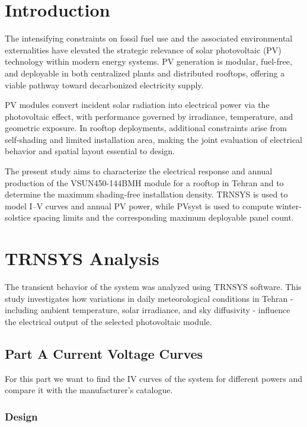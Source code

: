 \documentclass[11pt,a4paper]{article}
\begin{document}
\FloatBarrier
\section{Introduction}

The intensifying constraints on fossil fuel use and the associated environmental externalities have elevated the strategic relevance of solar photovoltaic (PV) technology within modern energy systems. PV generation is modular, fuel-free, and deployable in both centralized plants and distributed rooftops, offering a viable pathway toward decarbonized electricity supply.

PV modules convert incident solar radiation into electrical power via the photovoltaic effect, with performance governed by irradiance, temperature, and geometric exposure. In rooftop deployments, additional constraints arise from self-shading and limited installation area, making the joint evaluation of electrical behavior and spatial layout essential to design.

The present study aims to characterize the electrical response and annual production of the VSUN450-144BMH module for a rooftop in Tehran and to determine the maximum shading-free installation density. TRNSYS is used to model I--V curves and annual PV power, while PVsyst is used to compute winter-solstice spacing limits and the corresponding maximum deployable panel count.

\FloatBarrier
\section{TRNSYS Analysis}

The transient behavior of the system was analyzed using TRNSYS software. This study investigates how variations in daily meteorological conditions in Tehran - including ambient temperature, solar irradiance, and sky diffusivity - influence the electrical output of the selected photovoltaic module.

\subsection{Part A Current Voltage Curves}

For this part we want to find the IV curves of the system for different powers and compare it with the manufacturer’s catalogue.

\subsubsection{Design}
\end{document}
